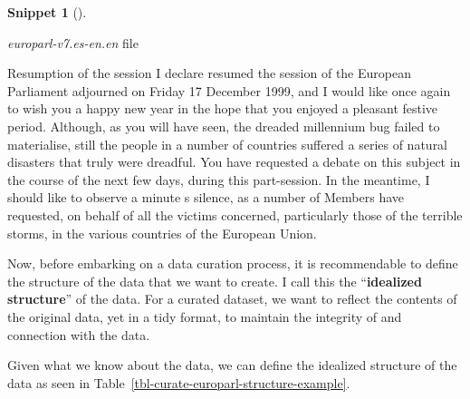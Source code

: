 \documentclass[
  letterpaper,
  krantz1]{latex/krantz-mod}
\newenvironment{Shaded}{\begin{snugshade}}{\end{snugshade}}
\newcommand{\NormalTok}[1]{\textcolor[rgb]{0.00,0.00,0.00}{#1}}
\theoremstyle{definition}
\newtheorem{definition}{Snippet}[chapter]
\theoremstyle{definition}
\theoremstyle{remark}
\begin{document}
\begin{definition}[]\protect\hypertarget{def-curate-europarl-en}{}\label{def-curate-europarl-en}

\emph{europarl-v7.es-en.en} file

\begin{Shaded}
\begin{Highlighting}[]
\NormalTok{Resumption of the session}
\NormalTok{I declare resumed the session of the European Parliament adjourned on Friday 17 December 1999, and I would like once again to wish you a happy new year in the hope that you enjoyed a pleasant festive period.}
\NormalTok{Although, as you will have seen, the dreaded \textquotesingle{}millennium bug\textquotesingle{} failed to materialise, still the people in a number of countries suffered a series of natural disasters that truly were dreadful.}
\NormalTok{You have requested a debate on this subject in the course of the next few days, during this part{-}session.}
\NormalTok{In the meantime, I should like to observe a minute\textquotesingle{} s silence, as a number of Members have requested, on behalf of all the victims concerned, particularly those of the terrible storms, in the various countries of the European Union.}
\end{Highlighting}
\end{Shaded}

\end{definition}

Now, before embarking on a data curation process, it
is recommendable to define the structure of the data that we want to
create. I call this the ``\textbf{idealized structure}'' of the data.
For a curated dataset, we want to reflect the contents of the original
data, yet in a tidy format, to maintain the integrity of and connection
with the data.

Given what we know about the data, we can define the idealized structure
of the data as seen in
Table~\ref{tbl-curate-europarl-structure-example}.
\end{document}
